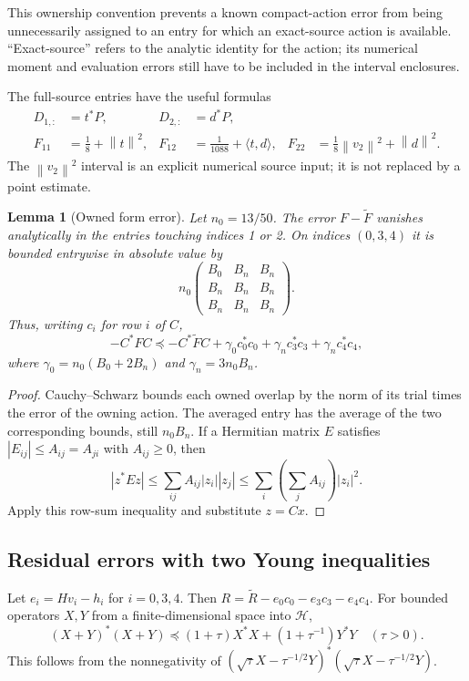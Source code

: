 \documentclass[11pt,a4paper]{article}
\numberwithin{equation}{section}
\newtheorem{lemma}[theorem]{Lemma}
\theoremstyle{definition}\newtheorem{definition}[theorem]{Definition}
\theoremstyle{remark}\newtheorem{remark}[theorem]{Remark}
\newcommand{\HH}{\mathcal H}
\newcommand{\ip}[2]{\langle #1,#2\rangle}
\newcommand{\norm}[1]{\left\|#1\right\|}
\begin{document}
This ownership convention prevents a known compact-action error from being unnecessarily assigned to an entry for which an exact-source action is available. ``Exact-source'' refers to the analytic identity for the action; its numerical moment and evaluation errors still have to be included in the interval enclosures.

The full-source entries have the useful formulas
\begin{align}\label{eq:sourceentries}
 D_{1,:}&=t^*P,&D_{2,:}&=d^*P,\nonumber\\
 F_{11}&=\tfrac18+\norm t^2,&
 F_{12}&=\tfrac1{1088}+\ip td, &
 F_{22}&=\tfrac18\norm{v_2}^2+\norm d^2.
\end{align}
The $\norm{v_2}^2$ interval is an explicit numerical source input; it is not replaced by a point estimate.

\begin{lemma}[Owned form error]\label{lem:Ferror}
Let $n_0=13/50$. The error $F-\widetilde F$ vanishes analytically in the entries touching indices 1 or 2. On indices $(0,3,4)$ it is bounded entrywise in absolute value by
\begin{equation}
 n_0\begin{pmatrix}B_0&B_n&B_n\\B_n&B_n&B_n\\B_n&B_n&B_n\end{pmatrix}.
\end{equation}
Thus, writing $c_i$ for row $i$ of $C$,
\begin{equation}\label{eq:Ferror}
 -C^*FC\preceq-C^*\widetilde FC+\gamma_0c_0^*c_0
 +\gamma_nc_3^*c_3+\gamma_nc_4^*c_4,
\end{equation}
where $\gamma_0=n_0(B_0+2B_n)$ and $\gamma_n=3n_0B_n$.
\end{lemma}
\begin{proof}
Cauchy--Schwarz bounds each owned overlap by the norm of its trial times the error of the owning action. The averaged entry has the average of the two corresponding bounds, still $n_0B_n$. If a Hermitian matrix $E$ satisfies $|E_{ij}|\le A_{ij}=A_{ji}$ with $A_{ij}\ge0$, then
\[
 |z^*Ez|\le\sum_{ij}A_{ij}|z_i||z_j|
 \le\sum_i\left(\sum_j A_{ij}\right)|z_i|^2.
\]
Apply this row-sum inequality and substitute $z=Cx$.
\end{proof}

\subsection{Residual errors with two Young inequalities}
Let $e_i=Hv_i-h_i$ for $i=0,3,4$. Then
$R=\widetilde R-e_0c_0-e_3c_3-e_4c_4$.
For bounded operators $X,Y$ from a finite-dimensional space into $\HH$,
\begin{equation}\label{eq:Young}
 (X+Y)^*(X+Y)\preceq(1+\tau)X^*X+(1+\tau^{-1})Y^*Y
 \quad(\tau>0).
\end{equation}
This follows from the nonnegativity of
$(\sqrt\tau X-\tau^{-1/2}Y)^*(\sqrt\tau X-\tau^{-1/2}Y)$.
\end{document}
